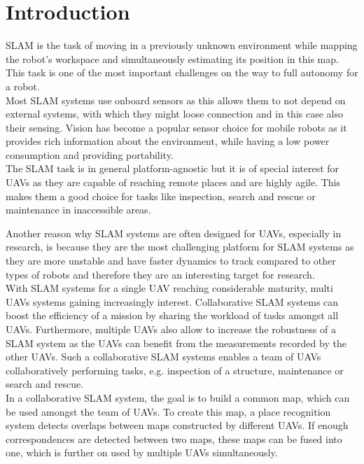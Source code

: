 \chapter{Introduction}
\label{sec:introduction}

\acf{SLAM} is the task of moving in a previously unknown environment while mapping the robot’s workspace and simultaneously estimating its position in this map. This task is one of the most important challenges on the way to full autonomy for a robot.\\

Most \ac{SLAM} systems use onboard sensors as this allows them to not depend on external systems, with which they might loose connection and in this case also their sensing. Vision has become a popular sensor choice for mobile robots as it provides rich information about the environment, while having a low power consumption and providing portability.\\

The \ac{SLAM} task is in general platform-agnostic but it is of special interest for \acfp{UAV} as they are capable of reaching remote places and are highly agile. This makes them a good choice for tasks like inspection, search and rescue or maintenance in inaccessible areas. 

Another reason why \ac{SLAM} systems are often designed for \acp{UAV}, especially in research, is because they are the most challenging platform for \ac{SLAM} systems as they are more unstable and have faster dynamics to track compared to other types of robots and therefore they are an interesting target for research.\\

With \ac{SLAM} systems for a single \ac{UAV} reaching considerable maturity, multi \acp{UAV} systems gaining increasingly interest. Collaborative \ac{SLAM} systems can boost the efficiency of a mission by sharing the workload of tasks amongst all \acp{UAV}. Furthermore, multiple \acp{UAV} also allow to increase the robustness of a \ac{SLAM} system as the \acp{UAV} can benefit from the measurements recorded by the other \acp{UAV}. Such a collaborative \ac{SLAM} systems enables a team of \acp{UAV} collaboratively performing tasks, e.g. inspection of a structure, maintenance or search and rescue.\\

In a collaborative \ac{SLAM} system, the goal is to build a common map, which can be used amongst the team of \acp{UAV}. To create this map, a place recognition system detects overlaps between maps constructed by different \acp{UAV}. If enough correspondences are detected between two maps, these maps can be fused into one, which is further on used by multiple \acp{UAV} simultaneously.\\

